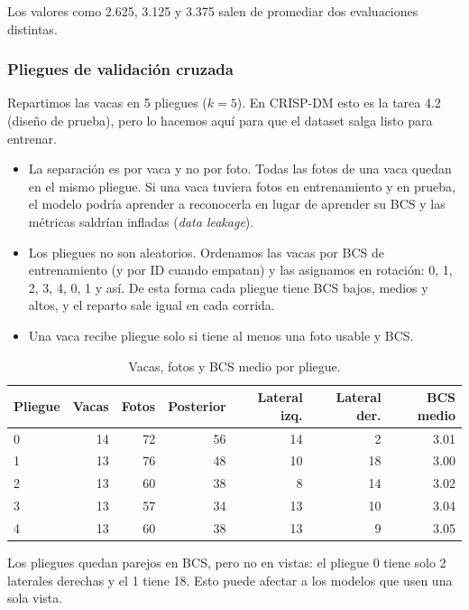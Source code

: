 Los valores como 2.625, 3.125 y 3.375 salen de promediar dos evaluaciones distintas.

\subsubsection*{Pliegues de validación cruzada}

Repartimos las vacas en 5 pliegues ($k = 5$). En CRISP-DM esto es la tarea 4.2 (diseño de prueba), pero lo hacemos aquí para que el dataset salga listo para entrenar.

\begin{itemize}
  \item La separación es por vaca y no por foto. Todas las fotos de una vaca quedan en el mismo pliegue. Si una vaca tuviera fotos en entrenamiento y en prueba, el modelo podría aprender a reconocerla en lugar de aprender su BCS y las métricas saldrían infladas (\textit{data leakage}).
  \item Los pliegues no son aleatorios. Ordenamos las vacas por BCS de entrenamiento (y por ID cuando empatan) y las asignamos en rotación: 0, 1, 2, 3, 4, 0, 1 y así. De esta forma cada pliegue tiene BCS bajos, medios y altos, y el reparto sale igual en cada corrida.
  \item Una vaca recibe pliegue solo si tiene al menos una foto usable y BCS.
\end{itemize}

\begin{table}[H]
  \centering
  \caption{Vacas, fotos y BCS medio por pliegue.}
  \label{tab:pliegues}
  \begin{tabular}{lrrrrrr}
    \toprule
    Pliegue & Vacas & Fotos & Posterior & Lateral izq. & Lateral der. & BCS medio \\
    \midrule
    0 & 14 & 72 & 56 & 14 & 2 & 3.01 \\
    1 & 13 & 76 & 48 & 10 & 18 & 3.00 \\
    2 & 13 & 60 & 38 & 8 & 14 & 3.02 \\
    3 & 13 & 57 & 34 & 13 & 10 & 3.04 \\
    4 & 13 & 60 & 38 & 13 & 9 & 3.05 \\
    \bottomrule
  \end{tabular}
\end{table}

Los pliegues quedan parejos en BCS, pero no en vistas: el pliegue 0 tiene solo 2 laterales derechas y el 1 tiene 18. Esto puede afectar a los modelos que usen una sola vista.

